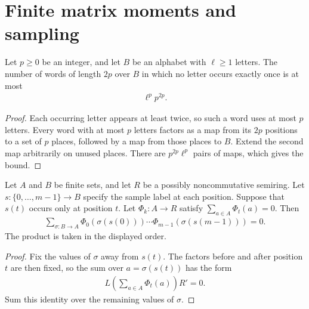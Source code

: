 \section{Finite matrix moments and sampling}

\begin{theorem}
    \label{thm:finite_matrix_even_word_count}
    \leanok
    Let $p\ge0$ be an integer, and let $B$ be an alphabet with
    $\ell\ge1$ letters. The number of words of length $2p$ over $B$ in
    which no letter occurs exactly once is at most
    \begin{align}
        \ell^p p^{2p}.
        \label{eq:finite_matrix_even_word_count}
    \end{align}
\end{theorem}
\begin{proof}\leanok
    Each occurring letter appears at least twice, so such a word
    uses at most $p$ letters. Every word with at most $p$ letters
    factors as a map from its $2p$ positions to a set of $p$ places,
    followed by a map from those places to $B$. Extend the second map
    arbitrarily on unused places. There are $p^{2p}\ell^p$ pairs of
    maps, which gives the bound.
\end{proof}


\begin{theorem}
    \label{thm:finite_matrix_singleton_cancellation}
    \leanok
    Let $A$ and $B$ be finite sets, and let $R$ be a possibly
    noncommutative semiring. Let $s:\{0,\ldots,m-1\}\to B$ specify
    the sample label at each position. Suppose that $s(t)$ occurs
    only at position $t$. Let $\Phi_k:A\to R$ satisfy
    $\sum_{a\in A}\Phi_t(a)=0$. Then
    \begin{align}
        \sum_{\sigma:B\to A}
        \Phi_0(\sigma(s(0)))\cdots\Phi_{m-1}(\sigma(s(m-1)))=0.
        \label{eq:finite_matrix_singleton_cancellation}
    \end{align}
    The product is taken in the displayed order.
\end{theorem}
\begin{proof}\leanok
    Fix the values of $\sigma$ away from $s(t)$. The factors before
    and after position $t$ are then fixed, so the sum over
    $a=\sigma(s(t))$ has the form
    \begin{align}
        L\left(\sum_{a\in A}\Phi_t(a)\right)R'=0.
        \label{eq:finite_matrix_singleton_cancellation_inner}
    \end{align}
    Sum this identity over the remaining values of $\sigma$.
\end{proof}



